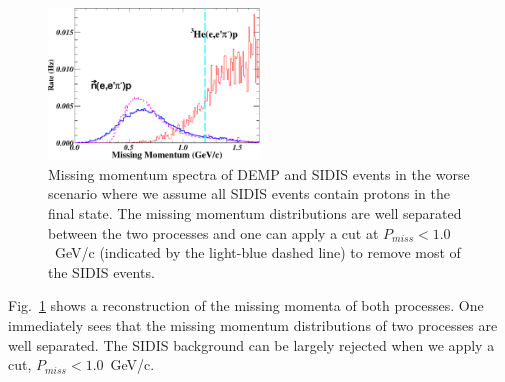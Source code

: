 \begin{figure}[!ht]
\begin{center}
\includegraphics[type=pdf,ext=.pdf,read=.pdf,width=0.5\textwidth]
{./figures/missing_mom_cut}
\caption[Missing Momentum]{\footnotesize{Missing momentum spectra of DEMP and
SIDIS events in the worse scenario where we assume all SIDIS events contain protons in the final state. 
The missing momentum distributions are well separated between the
two processes and one can apply a cut at $P_{miss}<1.0$~GeV/c (indicated by the
light-blue dashed line) to remove most of the SIDIS events. }}
  \label{missing_mom}
  \end{center}
\end{figure}

Fig.~\ref{missing_mom} shows a reconstruction of the missing momenta of both
processes. One immediately sees that the missing momentum distributions of two
processes are well separated.  The SIDIS background can be largely rejected
when we apply a cut, $P_{miss}<1.0$~GeV/c. 

